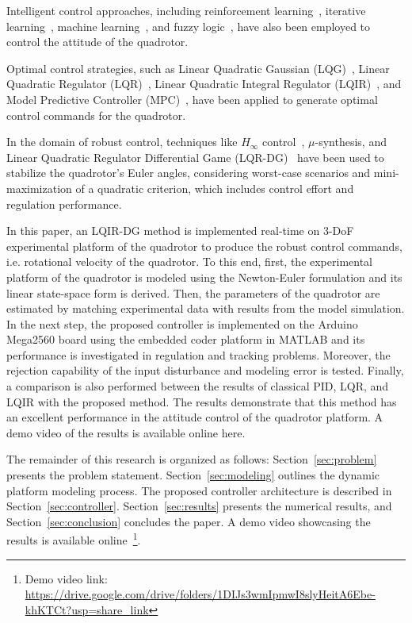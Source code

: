 \documentclass[3p]{elsarticle}
\begin{document}
Intelligent control approaches, including reinforcement learning~\cite{Hwangbo_2017, LIN2020135, XIE2023477, WANG2023222}, iterative learning~\cite{electronics10202474}, machine learning~\cite{4564736}, and fuzzy logic~\cite{GLIDA2022}, have also been employed to control the attitude of the quadrotor.

Optimal control strategies, such as Linear Quadratic Gaussian (LQG)~\cite{7367782}, Linear Quadratic Regulator (LQR)~\cite{7064553_LQR}, Linear Quadratic Integral Regulator (LQIR)~\cite{article_LQIR}, and Model Predictive Controller (MPC)~\cite{YAN202335, SANTOS2022123}, have been applied to generate optimal control commands for the quadrotor.

In the domain of robust control, techniques like $H_{\infty}$ control~\cite{WANG201910, REKABI202081}, $\mu$-synthesis, and Linear Quadratic Regulator Differential Game (LQR-DG)~\cite{10025263} have been used to stabilize the quadrotor's Euler angles, considering worst-case scenarios and mini-maximization of a quadratic criterion, which includes control effort and regulation performance.

In this paper, an LQIR-DG method is implemented real-time on 3-DoF experimental platform of the quadrotor to produce the robust control commands, i.e. rotational velocity of the quadrotor. To this end, first, the experimental platform of the quadrotor is modeled using the Newton-Euler formulation and its linear state-space form is derived. Then, the parameters of the quadrotor are estimated by matching experimental data with results from the model simulation. In the next step, the proposed controller is implemented on the Arduino Mega2560 board using the embedded coder platform in MATLAB and its performance is investigated in regulation and tracking problems. Moreover, the rejection capability of the input disturbance and modeling error is tested. Finally, a comparison is also performed between the results of classical PID, LQR, and LQIR with the proposed method. The results demonstrate that this method has an excellent performance in the attitude control of the quadrotor platform. A demo video of the results is available online here.

The remainder of this research is organized as follows: Section~\ref{sec:problem} presents the problem statement. Section~\ref{sec:modeling} outlines the dynamic platform modeling process. The proposed controller architecture is described in Section~\ref{sec:controller}. Section~\ref{sec:results} presents the numerical results, and Section~\ref{sec:conclusion} concludes the paper. A demo video showcasing the results is available online~\footnote{Demo video link: \url{https://drive.google.com/drive/folders/1DIJs3wmIpmwI8slyHeitA6Ebe-khKTCt?usp=share_link}}.
\end{document}
